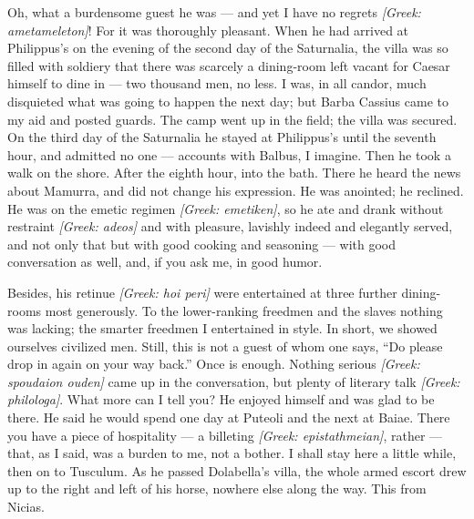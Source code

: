 

 Oh, what a burdensome guest he was --- and yet I have no regrets \textit{[Greek: ametameleton]}! For it was thoroughly pleasant. When he had arrived at Philippus's on the evening of the second day of the Saturnalia, the villa was so filled with soldiery that there was scarcely a dining-room left vacant for Caesar himself to dine in --- two thousand men, no less. I was, in all candor, much disquieted what was going to happen the next day; but Barba Cassius came to my aid and posted guards. The camp went up in the field; the villa was secured. On the third day of the Saturnalia he stayed at Philippus's until the seventh hour, and admitted no one --- accounts with Balbus, I imagine. Then he took a walk on the shore. After the eighth hour, into the bath. There he heard the news about Mamurra, and did not change his expression. He was anointed; he reclined. He was on the emetic regimen \textit{[Greek: emetiken]}, so he ate and drank without restraint \textit{[Greek: adeos]} and with pleasure, lavishly indeed and elegantly served, and not only that but with good cooking and seasoning --- with good conversation as well, and, if you ask me, in good humor.

 Besides, his retinue \textit{[Greek: hoi peri]} were entertained at three further dining-rooms most generously. To the lower-ranking freedmen and the slaves nothing was lacking; the smarter freedmen I entertained in style. In short, we showed ourselves civilized men. Still, this is not a guest of whom one says, ``Do please drop in again on your way back.'' Once is enough. Nothing serious \textit{[Greek: spoudaion ouden]} came up in the conversation, but plenty of literary talk \textit{[Greek: philologa]}. What more can I tell you? He enjoyed himself and was glad to be there. He said he would spend one day at Puteoli and the next at Baiae. There you have a piece of hospitality --- a billeting \textit{[Greek: epistathmeian]}, rather --- that, as I said, was a burden to me, not a bother. I shall stay here a little while, then on to Tusculum. As he passed Dolabella's villa, the whole armed escort drew up to the right and left of his horse, nowhere else along the way. This from Nicias.
